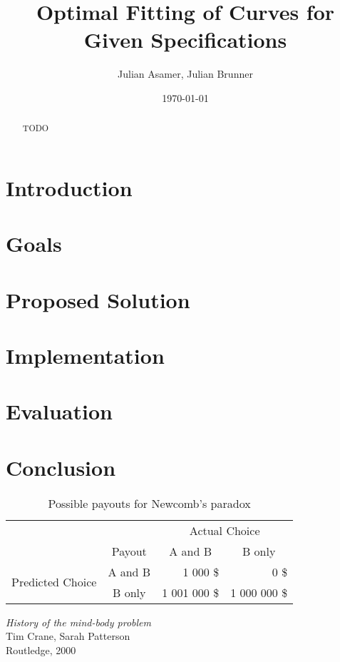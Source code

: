 \documentclass[a4paper]{article}
\title{Optimal Fitting of Curves for Given Specifications}
\author{Julian Asamer, Julian Brunner}
\date{\today}
\begin{document}
	\maketitle

	\begin{abstract}

		\noindent TODO

	\end{abstract}

	\section{Introduction}

	\section{Goals}

	\section{Proposed Solution}

	\section{Implementation}

	\section{Evaluation}

	\section{Conclusion}

		\begin{table}[htbp]
			\centering
			\begin{tabular}{c|c|r|r|}
				\multicolumn{1}{c}{} & \multicolumn{1}{c}{} & \multicolumn{2}{c}{Actual Choice} \\
				\cline{2-4}
				& Payout & \multicolumn{1}{|c|}{A and B} & \multicolumn{1}{|c|}{B only} \\
				\cline{2-4}
				\multirow{2}{*}{Predicted Choice} & A and B & 1 000 \$ & 0 \$ \\
				\cline{2-4}
				& B only & 1 001 000 \$ & 1 000 000 \$ \\
				\cline{2-4}
			\end{tabular}
			\caption{Possible payouts for Newcomb's paradox}
			\label{table:NewcombParadoxPayouts}
		\end{table}

	\begin{thebibliography}{}

			\emph{History of the mind-body problem}\\
			Tim Crane, Sarah Patterson\\
			Routledge, 2000

	\end{thebibliography}
\end{document}

